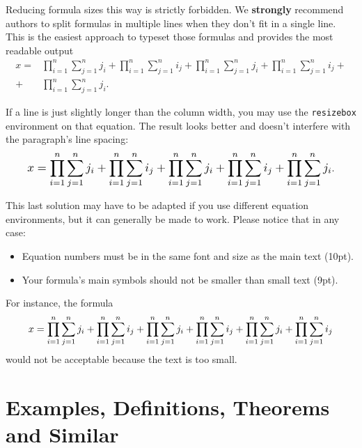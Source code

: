 \documentclass{article}
\begin{document}
Reducing formula sizes this way is strictly forbidden. We {\bf strongly} recommend authors to split formulas in multiple lines when they don't fit in a single line. This is the easiest approach to typeset those formulas and provides the most readable output%
%
\begin{align}
    x = & \prod_{i=1}^n \sum_{j=1}^n j_i + \prod_{i=1}^n \sum_{j=1}^n i_j + \prod_{i=1}^n \sum_{j=1}^n j_i + \prod_{i=1}^n \sum_{j=1}^n i_j + \nonumber \\
    +   & \prod_{i=1}^n \sum_{j=1}^n j_i.
\end{align}%

If a line is just slightly longer than the column width, you may use the {\tt resizebox} environment on that equation. The result looks better and doesn't interfere with the paragraph's line spacing: %
\begin{equation}
    \resizebox{.91\linewidth}{!}{$
            \displaystyle
            x = \prod_{i=1}^n \sum_{j=1}^n j_i + \prod_{i=1}^n \sum_{j=1}^n i_j + \prod_{i=1}^n \sum_{j=1}^n j_i + \prod_{i=1}^n \sum_{j=1}^n i_j + \prod_{i=1}^n \sum_{j=1}^n j_i
        $}.
\end{equation}%

This last solution may have to be adapted if you use different equation environments, but it can generally be made to work. Please notice that in any case:

\begin{itemize}
    \item Equation numbers must be in the same font and size as the main text (10pt).
    \item Your formula's main symbols should not be smaller than {\small small} text (9pt).
\end{itemize}

For instance, the formula
%
\begin{equation}
    \resizebox{.91\linewidth}{!}{$
            \displaystyle
            x = \prod_{i=1}^n \sum_{j=1}^n j_i + \prod_{i=1}^n \sum_{j=1}^n i_j + \prod_{i=1}^n \sum_{j=1}^n j_i + \prod_{i=1}^n \sum_{j=1}^n i_j + \prod_{i=1}^n \sum_{j=1}^n j_i + \prod_{i=1}^n \sum_{j=1}^n i_j
        $}
\end{equation}
%
would not be acceptable because the text is too small.

\section{Examples, Definitions, Theorems and Similar}
\end{document}
